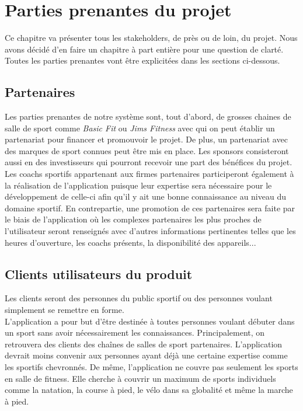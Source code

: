 \chapter{Parties prenantes du projet}

Ce chapitre va présenter tous les stakeholders, de près ou de loin, du projet. Nous avons décidé d'en faire un chapitre à part entière pour une question de clarté. Toutes les parties prenantes vont être explicitées dans les sections ci-dessous.

\section{Partenaires}

Les parties prenantes de notre système sont, tout d'abord, de grosses chaines de salle de sport comme \textit{Basic Fit} ou \textit{Jims Fitness} avec qui on peut établir un partenariat pour financer et promouvoir le projet. De plus, un partenariat avec des marques de sport connues peut être mis en place. Les sponsors consisteront aussi en des investisseurs qui pourront recevoir une part des bénéfices du projet.\\ 

Les coachs sportifs appartenant aux firmes partenaires participeront é\-ga\-le\-ment à la réalisation de l'application puisque leur expertise sera nécessaire pour le développement de celle-ci afin qu'il y ait une bonne connaissance au niveau du domaine sportif. En contrepartie, une promotion de ces partenaires sera faite par le biais de l'application où les complexes partenaires les plus proches de l'utilisateur seront renseignés avec d'autres informations pertinentes telles que les heures d'ouverture, les coachs présents, la disponibilité des appareils...

\section{Clients utilisateurs du produit}

Les clients seront des personnes du public sportif ou des personnes voulant simplement se remettre en forme.\\

L'application a pour but d'être destinée à toutes personnes voulant débuter dans un sport sans avoir nécessairement les connaissances. Principalement, on retrouvera des clients des chaînes de salles de sport partenaires. L'application devrait moins convenir aux personnes ayant déjà une certaine expertise comme les sportifs chevronnés. De même, l'application ne couvre pas seulement les sports en salle de fitness. Elle cherche à couvrir un maximum de sports individuels comme la natation, la course à pied, le vélo dans sa globalité et même la marche à pied.

